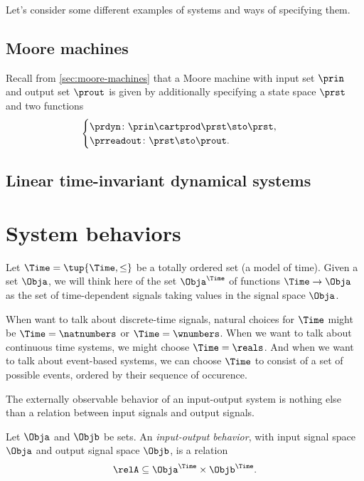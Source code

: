 

Let's consider some different examples of systems and ways of specifying them. 

\subsection{Moore machines}

Recall from \cref{sec:moore-machines} that a Moore machine with input set $\prin$ and output set $\prout$ is given by additionally specifying a state space $\prst$ and two functions
\begin{equation}
    \begin{cases}
        \prdyn \colon \prin \cartprod \prst \sto \prst, \\
        \prreadout \colon \prst \sto \prout.
    \end{cases}
\end{equation}


\subsection{Linear time-invariant dynamical systems}




\section{System behaviors}


Let $\Time = \tup{\Time, \leq}$ be a totally ordered set (a model of time). Given a set $\Obja$, we will think here of the set $\Obja^\Time$ of functions $\Time \to \Obja$ as the set of time-dependent signals taking values in the signal space $\Obja$. 

When want to talk about discrete-time signals, natural choices for $\Time$ might be $\Time = \natnumbers$ or $\Time = \wnumbers$. When we want to talk about continuous time systems, we might choose $\Time = \reals$. And when we want to talk about event-based systems, we can choose $\Time$ to consist of a set of possible events, ordered by their sequence of occurence. 

The externally observable behavior of an input-output system is nothing else than a relation between input signals and output signals. 

\begin{definition}
Let $\Obja$ and $\Objb$ be sets. An \emph{input-output behavior}, with input signal space $\Obja$ and output signal space $\Objb$, is a relation 
\begin{equation}
\relA \subseteq \Obja^\Time \times \Objb^\Time. 
\end{equation}
\end{definition}


